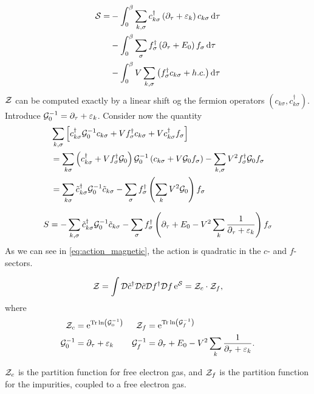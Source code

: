\begin{align}
\begin{split}
\mathcal{S} = &- \int_0^\beta\sum_{k,\sigma}c_{k\sigma}^\dagger\left(\partial_\tau + \varepsilon_k\right)c_{k\sigma} \dd{\tau} \\
&-\int_0^\beta\sum_\sigma f_\sigma^\dagger\left(\partial_\tau + E_0\right)f_\sigma \dd{\tau}\\
&-\int_0^\beta V\sum_{k, \sigma}\left(f_\sigma^\dagger c_{k\sigma} + h.c.\right)\dd{\tau}
\end{split}
\end{align}
\(\mathcal{Z}\) can be computed exactly by a linear shift og the fermion operators \((c_{k\sigma}, c_{k\sigma}^\dagger)\). Introduce \(\mathcal{G}_0^{-1}= \partial_\tau + \varepsilon_k\). Consider now the quantity
\begin{align*}
	&\sum_{k, \sigma}\left[c_{k\sigma}^\dagger \mathcal{G}_0^{-1}c_{k\sigma}+ Vf_{\sigma}^\dagger c_{k\sigma} + Vc_{k\sigma}^\dagger f_\sigma\right] \\
	&= \sum_{k\sigma}\left(c_{k\sigma}^\dagger + Vf_\sigma^\dagger \mathcal{G}_0\right)\mathcal{G}_0^{-1}\left(c_{k\sigma} + V\mathcal{G}_0 f_\sigma\right) -\sum_{k,\sigma}V^2f_\sigma^\dagger \mathcal{G}_0 f_\sigma \\
	&=\sum_{k\sigma}\tilde{c}_{k\sigma}^\dagger \mathcal{G}_0^{-1}\tilde{c}_{k\sigma} - \sum_\sigma f_\sigma^\dagger\left(\sum_k V^2\mathcal{G}_0\right)f_\sigma
\end{align*}

\begin{equation}
\label{eq:action_magnetic}
	S =-\sum_{k,\sigma}\tilde{c}_{k\sigma}^\dagger \mathcal{G}_0^{-1}\tilde{c}_{k\sigma}-\sum_\sigma f_\sigma^\dagger\left(\partial_\tau + E_0 - V^2\sum_k\frac{1}{\partial_\tau + \varepsilon_k}\right)f_\sigma
\end{equation}
As we can see in \eqref{eq:action_magnetic}, the action is quadratic in the $c$- and $f$- sectors.

\begin{equation}
	\mathcal{Z} = \int\mathcal{D}\tilde{c}^\dagger\mathcal{D}\tilde{c}\mathcal{D} f^\dagger \mathcal{D} f\, \mathrm{e}^{\mathcal{S}}= \mathcal{Z}_c\cdot\mathcal{Z}_f,
\end{equation}
where 
\begin{align*}
	\mathcal{Z}_c &= \mathrm{e}^{\Tr\ln \left(\mathcal{G}_0^{-1}\right)} & \mathcal{Z}_f&= \mathrm{e}^{\Tr\ln\left(\mathcal{G}_f^{-1}\right)}\\
	\mathcal{G}_0^{-1} &= \partial_\tau + \varepsilon_k &
	\mathcal{G}_f^{-1} &= \partial_\tau + E_0 -V^2\sum_k \frac{1}{\partial_\tau + \varepsilon_k}.
\end{align*}

$\mathcal{Z}_c$ is the partition function for free electron gas, and $\mathcal{Z}_f$ is the partition function for the impurities, coupled to a free electron gas.

